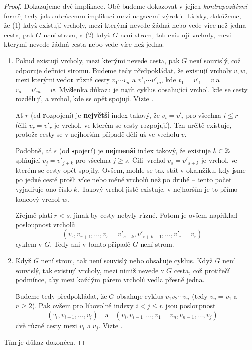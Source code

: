 \begin{proof}
 Dokazujeme dvě implikace. Obě budeme dokazovat v jejich \emph{kontrapozitivní}
 formě, tedy jako obrácenou implikaci mezi negacemi výroků. Lidsky, dokážeme, že
 (1) když existují vrcholy, mezi kterými nevede žádná nebo vede více než jedna
 cesta, pak $G$ není strom, a (2) když $G$ není strom, tak existují vrcholy,
 mezi kterými nevede žádná cesta nebo vede více než jedna.
 \begin{enumerate}
  \item Pokud existují vrcholy, mezi kterými nevede cesta, pak $G$ není
   souvislý, což odporuje definici stromu. Budeme tedy předpokládat, že existují
   vrcholy $v,w$, mezi kterými vedou různé cesty $v_1 \cdots v_n$ a $v'_1 \cdots
   v'_m$, kde $v_1 = v'_1 = v$ a $v_n = v'_m = w$. Myšlenka důkazu je najít
   cyklus obsahující vrchol, kde se cesty rozdělují, a vrchol, kde se opět
   spojují. Vizte .

   Ať $r$ (od \textbf{r}ozpojení) je \textbf{největší} index takový, že $v_i =
   v'_i$ pro všechna $i \leq r$ (čili $v_r = v'_r$ je vrchol, ve kterém se cesty
   rozpojují). Ten určitě existuje, protože cesty se v nejhorším případě dělí už
   ve vrcholu $v$.

   Podobně, ať $s$ (od \textbf{s}pojení) je \textbf{nejmenší} index takový, že
   existuje $k \in \mathbb{Z}$ splňující $v_j = v'_{j+k}$ pro všechna $j \geq s$. Čili,
   vrchol $v_s = v'_{s+k}$ je vrchol, ve kterém se cesty opět spojily. Ovšem,
   mohlo se tak stát v okamžiku, kdy jsme po jedné cestě prošli více nebo méně
   vrcholů než po druhé -- tento počet vyjadřuje ono číslo $k$. Takový vrchol
   jistě existuje, v nejhorším je to přímo koncový vrchol $w$.

   Zřejmě platí $r < s$, jinak by cesty nebyly různé. Potom je ovšem například
   posloupnost vrcholů
   \[
    (v_r,v_{r+1},\ldots,v_s = v'_{s+k},v'_{s+k-1},\ldots,v'_r = v_r)
   \]
   cyklem v $G$. Tedy ani v tomto případě $G$ není strom.
  \item Když $G$ není strom, tak není souvislý nebo obsahuje cyklus. Když $G$
   není souvislý, tak existují vrcholy, mezi nimiž nevede v $G$ cesta, což
   protiřečí podmínce, aby mezi každým párem vrcholů vedla přesně jedna.

   Budeme tedy předpokládat, že $G$ obsahuje cyklus $v_1v_2 \cdots v_n$ (tedy
   $v_n = v_1$ a $n \geq 2$). Pak ovšem pro libovolné indexy $i < j \leq n$ jsou
   posloupnosti
   \[
    (v_i,v_{i+1},\ldots,v_j) \quad \text{a} \quad (v_i,v_{i-1},\ldots,v_1 =
    v_n,v_{n-1},\ldots,v_j)
   \]
   dvě různé cesty mezi $v_i$ a $v_j$. Vizte
   .
 \end{enumerate}
 Tím je důkaz dokončen.
\end{proof}

